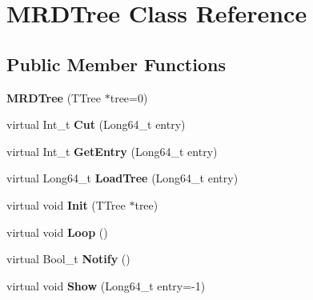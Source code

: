 \hypertarget{classMRDTree}{
\section{MRDTree Class Reference}
\label{classMRDTree}
}
\subsection*{Public Member Functions}
\begin{DoxyCompactItemize}
\item 
\hypertarget{classMRDTree_aeab336bcc0233f344b19f18cf879d65c}{
{\bfseries MRDTree} (TTree $\ast$tree=0)}
\label{classMRDTree_aeab336bcc0233f344b19f18cf879d65c}

\item 
\hypertarget{classMRDTree_ae43262ad3a6551b4617a3c046825f9f1}{
virtual Int\_\-t {\bfseries Cut} (Long64\_\-t entry)}
\label{classMRDTree_ae43262ad3a6551b4617a3c046825f9f1}

\item 
\hypertarget{classMRDTree_a1b46188d4d4b9f5c9d7e63c7305ab5ef}{
virtual Int\_\-t {\bfseries GetEntry} (Long64\_\-t entry)}
\label{classMRDTree_a1b46188d4d4b9f5c9d7e63c7305ab5ef}

\item 
\hypertarget{classMRDTree_ac4b67ff34ead1d39c5d324462e988726}{
virtual Long64\_\-t {\bfseries LoadTree} (Long64\_\-t entry)}
\label{classMRDTree_ac4b67ff34ead1d39c5d324462e988726}

\item 
\hypertarget{classMRDTree_ac380b6dac4ef6d6aecc09f3f90c4f3f6}{
virtual void {\bfseries Init} (TTree $\ast$tree)}
\label{classMRDTree_ac380b6dac4ef6d6aecc09f3f90c4f3f6}

\item 
\hypertarget{classMRDTree_abf8580954488c13d66eed0dde60f96b4}{
virtual void {\bfseries Loop} ()}
\label{classMRDTree_abf8580954488c13d66eed0dde60f96b4}

\item 
\hypertarget{classMRDTree_acb7f53057ebdd2a594b07c1294b5dde4}{
virtual Bool\_\-t {\bfseries Notify} ()}
\label{classMRDTree_acb7f53057ebdd2a594b07c1294b5dde4}

\item 
\hypertarget{classMRDTree_aec15bed544906066fdc89e749ef181aa}{
virtual void {\bfseries Show} (Long64\_\-t entry=-\/1)}
\label{classMRDTree_aec15bed544906066fdc89e749ef181aa}

\end{DoxyCompactItemize}
